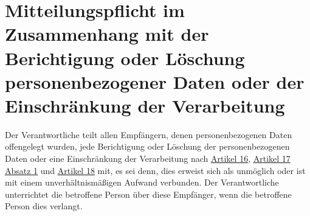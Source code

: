 \chapter{Mitteilungspflicht im Zusammenhang mit der Berichtigung oder Löschung personenbezogener Daten oder der
 Einschränkung der Verarbeitung}
\label{ch:19}


Der Verantwortliche teilt allen Empfängern, denen personenbezogenen Daten offengelegt wurden, jede Berichtigung oder
Löschung der personenbezogenen Daten oder eine Einschränkung der Verarbeitung nach \hyperref[ch:16]{Artikel 16},
\hyperref[itm:17-1]{Artikel 17 Absatz 1} und \hyperref[ch:18]{Artikel 18} mit, es sei denn, dies erweist sich als
unmöglich oder ist mit einem unverhältnismäßigen Aufwand verbunden. Der Verantwortliche unterrichtet die betroffene
Person über diese Empfänger, wenn die betroffene Person dies verlangt.


